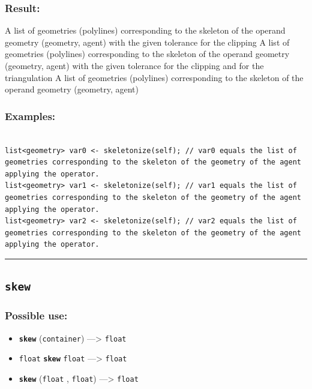 \documentclass[]{book}
\providecommand{\tightlist}{%
  \setlength{\itemsep}{0pt}\setlength{\parskip}{0pt}}
\theoremstyle{definition}
\theoremstyle{definition}
\theoremstyle{definition}
\theoremstyle{remark}
\begin{document}
\subsubsection{Result:}\label{result-463}

A list of geometries (polylines) corresponding to the skeleton of the
operand geometry (geometry, agent) with the given tolerance for the
clipping A list of geometries (polylines) corresponding to the skeleton
of the operand geometry (geometry, agent) with the given tolerance for
the clipping and for the triangulation A list of geometries (polylines)
corresponding to the skeleton of the operand geometry (geometry, agent)

\subsubsection{Examples:}\label{examples-335}

\begin{verbatim}
 
list<geometry> var0 <- skeletonize(self); // var0 equals the list of geometries corresponding to the skeleton of the geometry of the agent applying the operator. 
list<geometry> var1 <- skeletonize(self); // var1 equals the list of geometries corresponding to the skeleton of the geometry of the agent applying the operator. 
list<geometry> var2 <- skeletonize(self); // var2 equals the list of geometries corresponding to the skeleton of the geometry of the agent applying the operator.
\end{verbatim}

\begin{center}\rule{0.5\linewidth}{\linethickness}\end{center}

\subsection{\texorpdfstring{\texttt{skew}}{skew}}\label{skew}

\subsubsection{Possible use:}\label{possible-use-480}

\begin{itemize}
\tightlist
\item
  \textbf{\texttt{skew}} (\texttt{container}) ---\textgreater{}
  \texttt{float}
\item
  \texttt{float} \textbf{\texttt{skew}} \texttt{float} ---\textgreater{}
  \texttt{float}
\item
  \textbf{\texttt{skew}} (\texttt{float} , \texttt{float})
  ---\textgreater{} \texttt{float}
\end{itemize}
\end{document}
